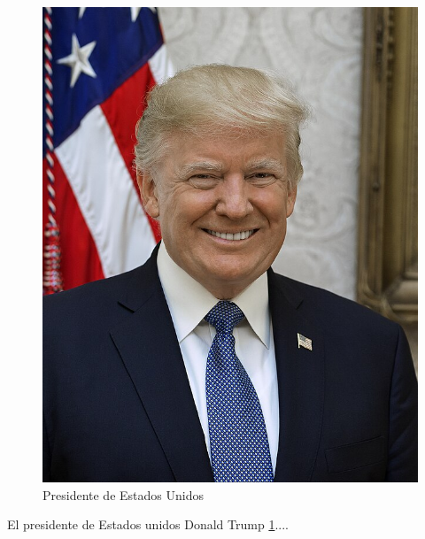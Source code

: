 \documentclass{article}
\begin{document}
\begin{figure}[h] %
    \begin{center} %
        \centering
        \includegraphics[width=0.9\linewidth]{Donald_Trump_official_portrait.jpg}
        \caption{Presidente de Estados Unidos}
        \label{fig:Trump}
    \end{center}
\end{figure}
El presidente de Estados unidos Donald Trump \ref{fig:Trump}....
\end{document}
